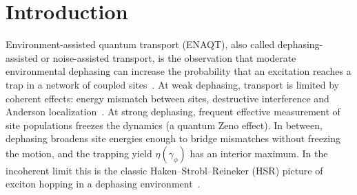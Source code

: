 \documentclass[aps,pre,preprint,floatfix]{revtex4-2}
\newcommand{\gp}{\gamma_\phi}
\begin{document}

\maketitle

\section{\label{sec:intro}Introduction}

Environment-assisted quantum transport (ENAQT), also called dephasing-assisted
or noise-assisted transport, is the observation that moderate environmental
dephasing can increase the probability that an excitation reaches a trap in a
network of coupled sites~\cite{mohseni2008,plenio2008,rebentrost2009,caruso2009}.
At weak dephasing, transport is limited by coherent effects: energy mismatch
between sites, destructive interference and Anderson
localization~\cite{anderson1958}.
At strong dephasing, frequent effective measurement of site populations
freezes the dynamics (a quantum Zeno effect).
In between, dephasing broadens site energies enough to bridge mismatches
without freezing the motion, and the trapping yield $\eta(\gp)$ has an
interior maximum.
In the incoherent limit this is the classic Haken--Strobl--Reineker (HSR)
picture of exciton hopping in a dephasing
environment~\cite{haken1972,haken1973,moix2013}.
\end{document}
